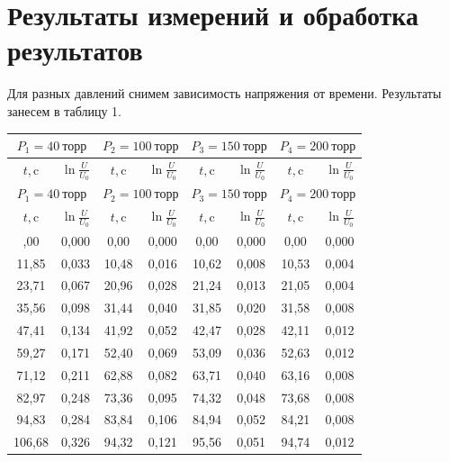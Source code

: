 \documentclass[a4paper,12pt]{article}
\theoremstyle{plain} %
\theoremstyle{definition} %
\theoremstyle{remark} %
\begin{document}
\section{Результаты измерений и обработка результатов}
Для разных давлений  снимем зависимость напряжения от времени. Результаты занесем в таблицу 1.
\begin{longtable}{|c|c|c|c|c|c|c|c|}
	\hline
	\multicolumn{2}{|c|}{$P_1 = 40\ \text{торр}$} & \multicolumn{2}{|c|}{$P_2 = 100 \ \text{торр}$} & \multicolumn{2}{|c|}{$P_3 = 150\ \text{торр}$} & \multicolumn{2}{|c|}{$P_4 = 200\ \text{торр}$} \\ \hline
	\rule{0cm}{3ex}
		$t, \text{c}$ &  $\ln \frac{U}{U_0}$  & $t, \text{c}$ & $\ln \frac{U}{U_0}$ & $t, \text{c}$  & $\ln \frac{U}{U_0}$   & $t, \text{c}$  & $\ln \frac{U}{U_0}$   \\ [1ex]\hline
	\endfirsthead
	\hline
	\multicolumn{2}{|c|}{$P_1 = 40\ \text{торр}$} & \multicolumn{2}{|c|}{$P_2 = 100 \ \text{торр}$} & \multicolumn{2}{|c|}{$P_3 = 150\ \text{торр}$} & \multicolumn{2}{|c|}{$P_4 = 200\ \text{торр}$} \\ \hline
		\rule{0cm}{3ex}
		$t, \text{c}$ &  $\ln \frac{U}{U_0}$  & $t, \text{c}$ & $\ln \frac{U}{U_0}$ & $t, \text{c}$  & $\ln \frac{U}{U_0}$   & $t, \text{c}$  & $\ln \frac{U}{U_0}$   \\ [1ex]\hline
	\endhead
	\hline
	\endfoot
	\endlastfoot
0,00   & 0,000    & 0,00   & 0,000    & 0,00   & 0,000    & 0,00   & 0,000    \\ \hline
11,85  & 0,033    & 10,48  & 0,016    & 10,62  & 0,008    & 10,53  & 0,004    \\ \hline
23,71  & 0,067    & 20,96  & 0,028    & 21,24  & 0,013    & 21,05  & 0,004    \\ \hline
35,56  & 0,098    & 31,44  & 0,040    & 31,85  & 0,020    & 31,58  & 0,008    \\ \hline
47,41  & 0,134    & 41,92  & 0,052    & 42,47  & 0,028    & 42,11  & 0,012    \\ \hline
59,27  & 0,171    & 52,40  & 0,069    & 53,09  & 0,036    & 52,63  & 0,012    \\ \hline
71,12  & 0,211    & 62,88  & 0,082    & 63,71  & 0,040    & 63,16  & 0,008    \\ \hline
82,97  & 0,248    & 73,36  & 0,095    & 74,32  & 0,048    & 73,68  & 0,008    \\ \hline
94,83  & 0,284    & 83,84  & 0,106    & 84,94  & 0,052    & 84,21  & 0,008    \\ \hline
106,68 & 0,326    & 94,32  & 0,121    & 95,56  & 0,051    & 94,74  & 0,012    \\ \hline

\end{longtable}
\end{document}
